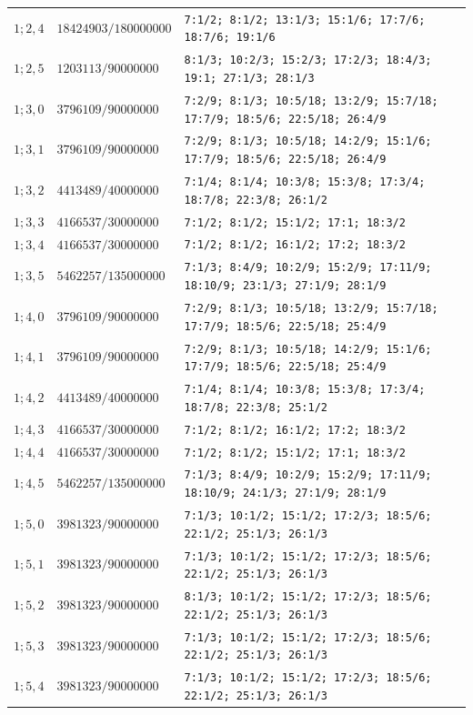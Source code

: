\begin{longtable}{@{}p{}p{}p{}@{}}
$1;2,4$ & $18424903/180000000$ & \texttt{7:1/2; 8:1/2; 13:1/3; 15:1/6; 17:7/6; 18:7/6; 19:1/6} \\
$1;2,5$ & $1203113/90000000$ & \texttt{8:1/3; 10:2/3; 15:2/3; 17:2/3; 18:4/3; 19:1; 27:1/3; 28:1/3} \\
$1;3,0$ & $3796109/90000000$ & \texttt{7:2/9; 8:1/3; 10:5/18; 13:2/9; 15:7/18; 17:7/9; 18:5/6; 22:5/18; 26:4/9} \\
$1;3,1$ & $3796109/90000000$ & \texttt{7:2/9; 8:1/3; 10:5/18; 14:2/9; 15:1/6; 17:7/9; 18:5/6; 22:5/18; 26:4/9} \\
$1;3,2$ & $4413489/40000000$ & \texttt{7:1/4; 8:1/4; 10:3/8; 15:3/8; 17:3/4; 18:7/8; 22:3/8; 26:1/2} \\
$1;3,3$ & $4166537/30000000$ & \texttt{7:1/2; 8:1/2; 15:1/2; 17:1; 18:3/2} \\
$1;3,4$ & $4166537/30000000$ & \texttt{7:1/2; 8:1/2; 16:1/2; 17:2; 18:3/2} \\
$1;3,5$ & $5462257/135000000$ & \texttt{7:1/3; 8:4/9; 10:2/9; 15:2/9; 17:11/9; 18:10/9; 23:1/3; 27:1/9; 28:1/9} \\
$1;4,0$ & $3796109/90000000$ & \texttt{7:2/9; 8:1/3; 10:5/18; 13:2/9; 15:7/18; 17:7/9; 18:5/6; 22:5/18; 25:4/9} \\
$1;4,1$ & $3796109/90000000$ & \texttt{7:2/9; 8:1/3; 10:5/18; 14:2/9; 15:1/6; 17:7/9; 18:5/6; 22:5/18; 25:4/9} \\
$1;4,2$ & $4413489/40000000$ & \texttt{7:1/4; 8:1/4; 10:3/8; 15:3/8; 17:3/4; 18:7/8; 22:3/8; 25:1/2} \\
$1;4,3$ & $4166537/30000000$ & \texttt{7:1/2; 8:1/2; 16:1/2; 17:2; 18:3/2} \\
$1;4,4$ & $4166537/30000000$ & \texttt{7:1/2; 8:1/2; 15:1/2; 17:1; 18:3/2} \\
$1;4,5$ & $5462257/135000000$ & \texttt{7:1/3; 8:4/9; 10:2/9; 15:2/9; 17:11/9; 18:10/9; 24:1/3; 27:1/9; 28:1/9} \\
$1;5,0$ & $3981323/90000000$ & \texttt{7:1/3; 10:1/2; 15:1/2; 17:2/3; 18:5/6; 22:1/2; 25:1/3; 26:1/3} \\
$1;5,1$ & $3981323/90000000$ & \texttt{7:1/3; 10:1/2; 15:1/2; 17:2/3; 18:5/6; 22:1/2; 25:1/3; 26:1/3} \\
$1;5,2$ & $3981323/90000000$ & \texttt{8:1/3; 10:1/2; 15:1/2; 17:2/3; 18:5/6; 22:1/2; 25:1/3; 26:1/3} \\
$1;5,3$ & $3981323/90000000$ & \texttt{7:1/3; 10:1/2; 15:1/2; 17:2/3; 18:5/6; 22:1/2; 25:1/3; 26:1/3} \\
$1;5,4$ & $3981323/90000000$ & \texttt{7:1/3; 10:1/2; 15:1/2; 17:2/3; 18:5/6; 22:1/2; 25:1/3; 26:1/3} \\

\end{longtable}
